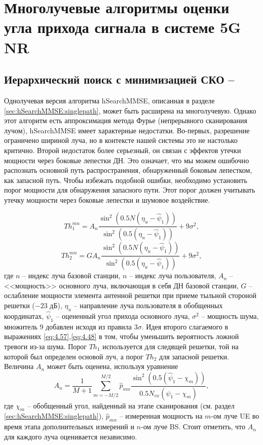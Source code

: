 \section{Многолучевые алгоритмы оценки угла прихода сигнала в системе 5G NR}
\subsection[Иерархический поиск с минимизацией СКО]{Иерархический поиск с минимизацией СКО -- \hSearchMMSE{}}
\label{sec:hSearchMMSE:multipath}

Однолучевая версия алгоритма hSearchMMSE, описанная в разделе
\ref{sec:hSearchMMSE:singlepath},
может быть расширена на многолучевую.  Однако этот алгоритм есть аппроксимация
метода Фурье (непрерывного сканирования лучом), hSearchMMSE имеет характерные
недостатки.
Во-первых, разрешение ограничено шириной луча, но в контексте нашей
системы это не настолько критично. Второй недостаток более серьезный, он связан
с эффектов утечки мощности через боковые лепестки ДН.  Это означает, что мы
можем ошибочно распознать основной путь распространения, обнаруженный боковым
лепестком, как запасной путь.  Чтобы избежать подобной ошибки, необходимо
установить порог мощности для обнаружения запасного пути. Этот порог должен
учитывать утечку мощности через боковые лепестки и шумовое воздействие.

\begin{equation}
    \label{eq:4.57}
    Th_1^{mn} = A_n
    \frac
    {\sin^2(0.5 N (\eta_u - \hat \psi_1))}
    {\sin^2(0.5 (\eta_u - \hat \psi_1))} + 9 \sigma^2,
\end{equation}
\begin{equation}
    \label{eq:4.58}
    Th_2^{mn} = G A_n \frac{\sin^2(0.5 N (\eta_u - \hat \psi_1))}
    {\sin^2(0.5 (\eta_u - \hat \psi_1))} + 9 \sigma^2,
\end{equation}
где $n$ -- индекс луча базовой станции, $n$ -- индекс луча пользователя, $A_n$
-- <<мощность>> основного луча, включающая в себя ДН базовой станции, $G$ --
ослабление мощности элемента антенной решетки при приеме тыльной стороной
решетки ($-23$ дБ), $\eta_u$ -- направление луча пользователя в обобщенных
координатах, $\hat \psi_1$ -- оцененный угол прихода основного луча, $\sigma^2$
-- мощность шума, множитель $9$ добавлен исходя из правила $3\sigma$.
Идея второго слагаемого в выражениях \eqref{eq:4.57},\eqref{eq:4.48} в том,
чтобы уменьшить вероятность ложной тревоги из-за шума.
Порог $Th_1$ используется
для следящей решетки, той на которой был определен основой луч, а порог $Th_2$
для запасной решетки.  Величина $A_n$ может быть оценена, используя уравнение
\begin{equation}
    \label{eq:4.59}
    A_n = \frac{1}{M+1} \sum\limits_{m=-M/2}^{M/2} \hat p_{mn}
    \frac{\sin^2(0.5(\hat \psi_1 - \chi_m))}{0.5 N_{rx}(\hat \psi_1 - \chi_m)},
\end{equation}
где $\chi_m$ -- обобщенный угол, найденный на этапе сканирования
(см. раздел \eqref{sec:hSearchMMSE:singlepath}), $\hat p_{mn}$ --
измеренная мощность на $m$-ом луче UE во время этапа дополнительных измерений и
$n$-ом луче BS.
Стоит отметить, что $A_n$ для каждого луча оценивается независимо.


